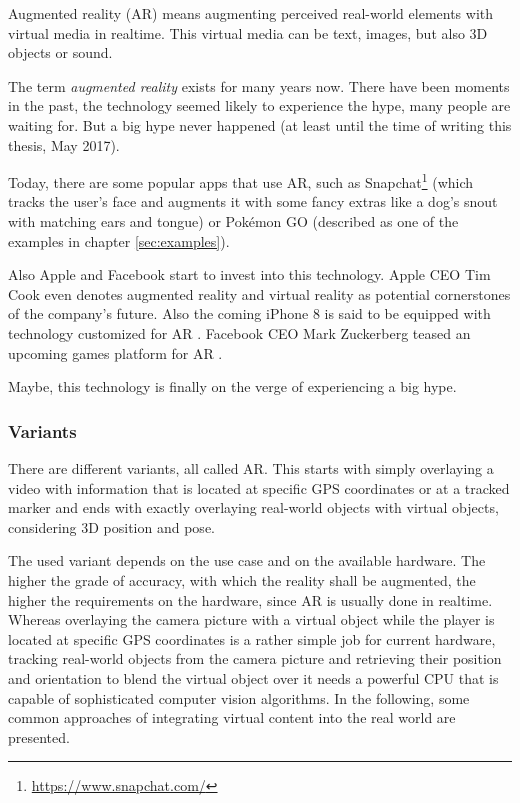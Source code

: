 Augmented reality (AR) means augmenting perceived real-world elements with virtual media in realtime. This virtual media can be text, images, but also 3D objects or sound.

The term \emph{augmented reality} exists for many years now. There have been moments in the past, the technology seemed likely to experience the hype, many people are waiting for. But a big hype never happened (at least until the time of writing this thesis, May 2017).

Today, there are some popular apps that use AR, such as Snapchat\footnote{\url{https://www.snapchat.com/}} (which tracks the user's face and augments it with some fancy extras like a dog's snout with matching ears and tongue) or Pok\'{e}mon GO (described as one of the examples in chapter \ref{sec:examples}).

Also Apple and Facebook start to invest into this technology. Apple CEO Tim Cook even denotes augmented reality and virtual reality as potential cornerstones of the company's future. Also the coming iPhone 8 is said to be equipped with technology customized for AR \citep{iPhone8AR}. Facebook CEO Mark Zuckerberg teased an upcoming games platform for AR \citep{facebookAR}.

Maybe, this technology is finally on the verge of experiencing a big hype.

\subsubsection{Variants}
There are different variants, all called AR. This starts with simply overlaying a video with information that is located at specific GPS coordinates or at a tracked marker and ends with exactly overlaying real-world objects with virtual objects, considering 3D position and pose.

The used variant depends on the use case and on the available hardware. The higher the grade of accuracy, with which the reality shall be augmented, the higher the requirements on the hardware, since AR is usually done in realtime. Whereas overlaying the camera picture with a virtual object while the player is located at specific GPS coordinates is a rather simple job for current hardware, tracking real-world objects from the camera picture and retrieving their position and orientation to blend the virtual object over it needs a powerful CPU that is capable of sophisticated computer vision algorithms. In the following, some common approaches of integrating virtual content into the real world are presented.

